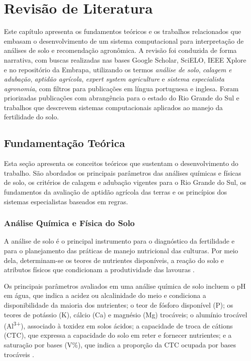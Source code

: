 \chapter{Revisão de Literatura}\label{chap:revisao}

Este capítulo apresenta os fundamentos teóricos e os trabalhos relacionados
que embasam o desenvolvimento de um sistema computacional para interpretação
de análises de solo e recomendação agronômica. A revisão foi conduzida
de forma narrativa, com buscas realizadas nas bases Google Scholar, SciELO,
IEEE Xplore e no repositório da Embrapa, utilizando os termos
\textit{análise de solo}, \textit{calagem e adubação}, \textit{aptidão agrícola},
\textit{expert system agriculture} e \textit{sistema especialista agronomia},
com filtros para publicações em língua portuguesa e inglesa. Foram priorizadas
publicações com abrangência para o estado do Rio Grande do Sul e trabalhos
que descrevem sistemas computacionais aplicados ao manejo da fertilidade do solo.

\section{Fundamentação Teórica}

Esta seção apresenta os conceitos teóricos que sustentam o desenvolvimento
do trabalho. São abordados os principais parâmetros das análises químicas e
físicas de solo, os critérios de calagem e adubação vigentes para o Rio Grande
do Sul, os fundamentos da avaliação de aptidão agrícola das terras e os
princípios dos sistemas especialistas baseados em regras.

\subsection{Análise Química e Física do Solo}

A análise de solo é o principal instrumento para o diagnóstico da fertilidade
e para o planejamento das práticas de manejo nutricional das culturas. Por meio
dela, determinam-se os teores de nutrientes disponíveis, a reação do solo e
atributos físicos que condicionam a produtividade das lavouras
\citep{Embrapa2011}.

Os principais parâmetros avaliados em uma análise química de solo incluem o
pH em água, que indica a acidez ou alcalinidade do meio e condiciona a
disponibilidade da maioria dos nutrientes; o teor de fósforo disponível (P);
os teores de potássio (K), cálcio (Ca) e magnésio (Mg) trocáveis; o alumínio
trocável (Al\textsuperscript{3+}), associado à toxidez em solos ácidos;
a capacidade de troca de cátions (CTC), que expressa a capacidade do solo
em reter e fornecer nutrientes; e a saturação por bases (V\%), que indica
a proporção da CTC ocupada por bases trocáveis \citep{Embrapa2011, ManualCalagem2016}.

